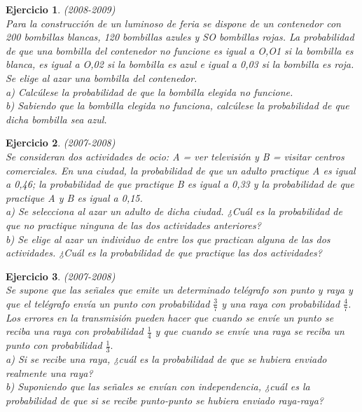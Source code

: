 \documentclass[12pt, a4paper]{amsart}
\newtheorem{ejer}{Ejercicio}
\begin{document}
\begin{ejer}\em (2008-2009)\\%
Para la construcción de un luminoso de feria se dispone de un contenedor con 200 bombillas blancas, 120 bombillas azules y SO bombillas rojas. La probabilidad de que una bombilla del contenedor no funcione es igual a O,O1 si la bombilla es blanca, es igual a O,02 si la bombilla es azul e igual a 0,03 si la bombilla es roja. Se elige al azar una bombilla del contenedor.\\
a) Calcúlese la probabilidad de que la bombilla elegida no funcione.\\
b) Sabiendo que la bombilla elegida no funciona, calcúlese la probabilidad de que dicha bombilla sea azul.
\end{ejer}

\begin{ejer}\em (2007-2008)\\%
Se consideran dos actividades de ocio: A = ver televisión y B = visitar centros comerciales. En una ciudad, la probabilidad de que un adulto practique A es igual a 0,46; la probabilidad de que practique B es igual a 0,33 y la probabilidad de que practique A y B es igual a 0,15.\\
a) Se selecciona al azar un adulto de dicha ciudad. ¿Cuál es la probabilidad de que no practique ninguna de las dos actividades anteriores?\\
b) Se elige al azar un individuo de entre los que practican alguna de las dos actividades. ¿Cuál es la probabilidad de que practique las dos actividades?
\end{ejer}

\begin{ejer}\em (2007-2008)\\%
Se supone que las señales que emite un determinado telégrafo son \textit{punto} y \textit{raya} y que el telégrafo envía un \textit{punto} con probabilidad $\frac{3}{7}$ y una \textit{raya} con probabilidad $\frac{4}{7}$. Los errores en la transmisión pueden hacer que cuando se envíe un \textit{punto} se reciba una \textit{raya} con probabilidad $\frac{1}{4}$ y que cuando se envíe una \textit{raya} se reciba un \textit{punto} con probabilidad $\frac{1}{3}.$\\
a) Si se recibe una \textit{raya}, ¿cuál es la probabilidad de que se hubiera enviado realmente una \textit{raya}?\\
b) Suponiendo que las señales se envían con independencia, ¿cuál es la probabilidad de que si se recibe \textit{punto}-\textit{punto} se hubiera enviado \textit{raya}-\textit{raya}?
\end{ejer}
\end{document}
